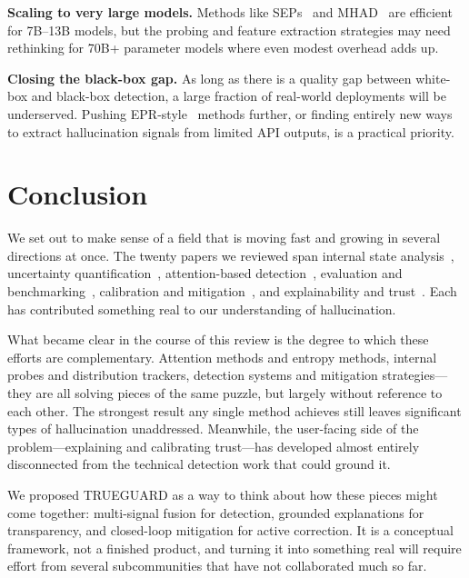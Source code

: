 \documentclass[journal]{IEEEtran}
\begin{document}
\textbf{Scaling to very large models.} Methods like SEPs~\cite{sep} and MHAD~\cite{mhad} are efficient for 7B--13B models, but the probing and feature extraction strategies may need rethinking for 70B+ parameter models where even modest overhead adds up.

\textbf{Closing the black-box gap.} As long as there is a quality gap between white-box and black-box detection, a large fraction of real-world deployments will be underserved. Pushing EPR-style~\cite{epr} methods further, or finding entirely new ways to extract hallucination signals from limited API outputs, is a practical priority.

\section{Conclusion}

We set out to make sense of a field that is moving fast and growing in several directions at once. The twenty papers we reviewed span internal state analysis~\cite{mind, prism, mhad, sep, hallushift, hallushift_pp}, uncertainty quantification~\cite{semantic_energy, uq_survey, epr}, attention-based detection~\cite{map_misbelief, rauq, llmcheck}, evaluation and benchmarking~\cite{trustllm, faithfulness, survey_alansari}, calibration and mitigation~\cite{entropy_spike, calibrated_rl, expandr}, and explainability and trust~\cite{xai_survey, human_trust}. Each has contributed something real to our understanding of hallucination.

What became clear in the course of this review is the degree to which these efforts are complementary. Attention methods and entropy methods, internal probes and distribution trackers, detection systems and mitigation strategies---they are all solving pieces of the same puzzle, but largely without reference to each other. The strongest result any single method achieves still leaves significant types of hallucination unaddressed. Meanwhile, the user-facing side of the problem---explaining and calibrating trust---has developed almost entirely disconnected from the technical detection work that could ground it.

We proposed TRUEGUARD as a way to think about how these pieces might come together: multi-signal fusion for detection, grounded explanations for transparency, and closed-loop mitigation for active correction. It is a conceptual framework, not a finished product, and turning it into something real will require effort from several subcommunities that have not collaborated much so far.
\end{document}
